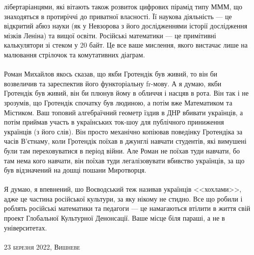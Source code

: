 лібертаріанцями, які вітають також розвиток цифрових пірамід типу МММ, що знаходяться
в протиріччі до приватної власності. Її наукова діяльність --- це відкритий абюз
науки (як у Невзорова з його дослідженнями історії дослідження мізків Леніна) та
вищої освіти. Російські математики --- це примітивні калькулятори зі стеком у 20 байт.
Це все ваше мислення, якого вистачає лише на малювання стрілочок та комутативних діаграм.
\\
\\
Роман Михайлов якось сказав, що якби Гротендік був живий, то він би возвеличив та
зареспектив його функторіальну fr-мову. А я думаю, якби Гротендік був живий, він
би плюнув йому в обличчя і насцяв в рота. Він так і не зрозумів, що Гротендік
спочатку був людиною, а потім вже Математиком та Містиком. Ваш топовий алгебраїчний
геометр їздив в ДНР вбивати українців, а потім приймав участь в українських ток-шоу
для публічного приниження українців (з його слів). Він просто механічно копіював
поведінку Гротендіка за часів В'єтнаму, коли Гротендік поїхав в джунглі навчати
студентів, які вимушені були там переховуватися в період війни. Але Роман не
поїхав туди навчати, бо там нема кого навчати, він поїхав туди легалізовувати
вбивство українців, за що був відзначений на дошці пошани Миротворця.
\\
\\
Я думаю, я впевнений, шо Воєводський теж називав українців <<хохлами>>, адже
це частина російської культури, за яку нікому не стидно.
Все що робили і роблять російські математики та педагоги --- це намагаються
втілити в життя свій проект Глобальної Культурної Денонсації. Ваше місце
біля параші, а не в університетах.
\\
\\
\textsc{\footnotesize 23 березня 2022, Вишневе}

\normalsize
